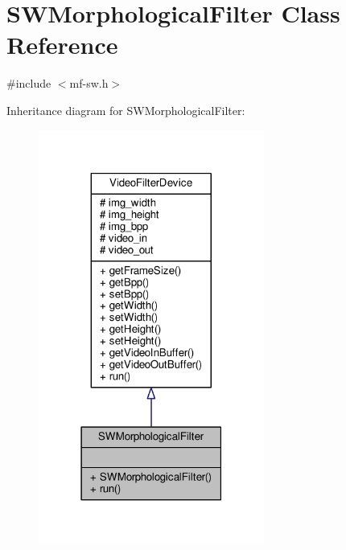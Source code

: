 \hypertarget{classSWMorphologicalFilter}{}\section{S\+W\+Morphological\+Filter Class Reference}
\label{classSWMorphologicalFilter}


{\ttfamily \#include $<$mf-\/sw.\+h$>$}



Inheritance diagram for S\+W\+Morphological\+Filter\+:
\nopagebreak
\begin{figure}[H]
\begin{center}
\leavevmode
\includegraphics[width=210pt]{classSWMorphologicalFilter__inherit__graph}
\end{center}
\end{figure}


